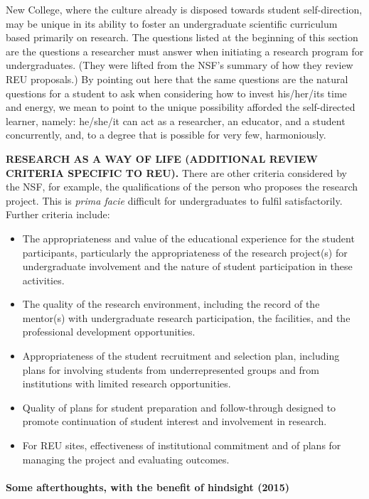 New College, where the culture already is disposed towards student
self-direction, may be unique in its ability to foster an undergraduate
scientific curriculum based primarily on research. The questions listed
at the beginning of this section are the questions a researcher must
answer when initiating a research program for undergraduates. (They were
lifted from the NSF's summary of how they review REU proposals.) By
pointing out here that the same questions are the natural questions for
a student to ask when considering how to invest his/her/its time and
energy, we mean to point to the unique possibility afforded the
self-directed learner, namely: he/she/it can act as a researcher, an
educator, and a student concurrently, and, to a degree that is possible
for very few, harmoniously.

\textbf{RESEARCH AS A WAY OF LIFE (ADDITIONAL REVIEW CRITERIA SPECIFIC
TO REU).} There are other criteria considered by the NSF, for example,
the qualifications of the person who proposes the research project. This
is \emph{prima facie} difficult for undergraduates to fulfil
satisfactorily. Further criteria include:

\begin{itemize}
\tightlist
\item
  The appropriateness and value of the educational experience for the
  student participants, particularly the appropriateness of the research
  project(s) for undergraduate involvement and the nature of student
  participation in these activities.
\item
  The quality of the research environment, including the record of the
  mentor(s) with undergraduate research participation, the facilities,
  and the professional development opportunities.
\item
  Appropriateness of the student recruitment and selection plan,
  including plans for involving students from underrepresented groups
  and from institutions with limited research opportunities.
\item
  Quality of plans for student preparation and follow-through designed
  to promote continuation of student interest and involvement in
  research.
\item
  For REU sites, effectiveness of institutional commitment and of plans
  for managing the project and evaluating outcomes.
\end{itemize}

\hypertarget{some-afterthoughts-with-the-benefit-of-hindsight-2015}{%
\paragraph{Some afterthoughts, with the benefit of hindsight
(2015)}\label{some-afterthoughts-with-the-benefit-of-hindsight-2015}}

